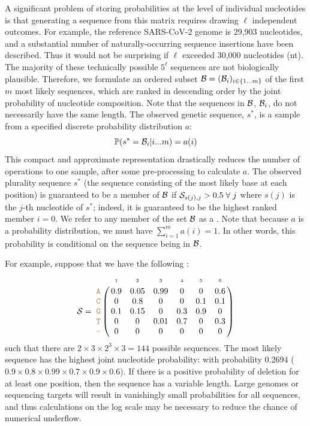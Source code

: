 \documentclass[12pt]{article}
\begin{document}
A significant problem of storing probabilities at the level of individual nucleotides is that generating a sequence from this matrix requires drawing $\ell$ independent outcomes.
For example, the reference SARS-CoV-2 genome is 29,903 nucleotides, and a substantial number of naturally-occurring sequence insertions have been described.
Thus it would not be surprising if $\ell$ exceeded 30,000 nucleotides (nt).
The majority of these technically possible $5^\ell$ sequences are not biologically plausible.
Therefore, we formulate an ordered subset $\mathcal{B} = (\mathcal{B}_i)_{i\in\{1\ldots m\} }$ of the first $m$ most likely sequences, which are ranked in descending order by the joint probability of nucleotide composition.
Note that the sequences in $\mathcal{B}$, $\mathcal{B}_i$, do not necessarily have the same length.
The observed genetic sequence, $s^*$, is a sample from a specified discrete probability distribution $a$:
\begin{equation}
\mathbb{P}(s^* = \mathcal{B}_i | i ... m) = a(i)
\end{equation}
This compact and approximate representation drastically reduces the number of operations to one sample, after some pre-processing to calculate $a$.
The observed plurality sequence $s^*$ (the sequence consisting of the most likely base at each position) is guaranteed to be a member of $\mathcal{B}$ if $\mathcal{S}_{s(j), j} > 0.5\;\forall\;j$ where $s(j)$ is the $j$-th nucleotide of $s^*$; indeed, it is guaranteed to be the highest ranked member $i=0$.
We refer to any member of the set $\mathcal{B}$ as a \emph{\slps}.
Note that because $a$ is a probability distribution, we must have $\sum_{i=1}^m a(i) = 1$.
In other words, this probability is conditional on the sequence being in $\mathcal{B}$.


For example, suppose that we have the following \nlps:
\begin{equation}
\nps = 
\bordermatrix{
& \scriptscriptstyle{1} & \scriptscriptstyle{2}& \scriptscriptstyle{3}& \scriptscriptstyle{4} & \scriptscriptstyle{5} & \scriptscriptstyle{6} \cr
\sq{A} & 0.9 & 0.05   & 0.99 & 0 & 0 & 0.6\cr
\sq{C} & 0   & 0.8 & 0 & 0 & 0.1 & 0.1\cr
\sq{G} & 0.1 & 0.15 & 0 & 0.3 & 0.9 & 0\cr
\sq{T} & 0 & 0 & 0.01 & 0.7 & 0 & 0.3\cr
\sq{-} & 0 & 0 & 0 & 0 & 0 & 0\cr
}\label{eq:nlps}
\end{equation}
such that there are $2\times 3 \times 2^3 \times 3 = 144$ possible sequences.
The most likely sequence has the highest joint nucleotide probability:  with probability 0.2694 ($0.9\times 0.8\times 0.99 \times 0.7 \times 0.9 \times 0.6$).
If there is a positive probability of deletion for at least one position, then the sequence has a variable length.
Large genomes or sequencing targets will result in vanishingly small probabilities for all sequences, and thus calculations on the log scale may be necessary to reduce the chance of numerical underflow.
\end{document}

